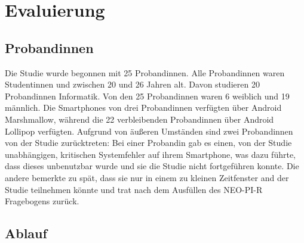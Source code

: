 
\chapter{Evaluierung}
\label{ch:Evaluierung}


\section{Probandinnen}
\label{ch:Evaluierung:sec:Abschnitt1}

Die Studie wurde begonnen mit 25 Probandinnen.
Alle Probandinnen waren Studentinnen und zwischen 20 und 26 Jahren alt.
Davon studieren 20 Probandinnen Informatik. 
Von den 25 Probandinnen waren 6 weiblich und 19 männlich.
Die Smartphones von drei Probandinnen verfügten über Android Marshmallow, während die 22 verbleibenden Probandinnen über Android Lollipop verfügten.  
Aufgrund von äußeren Umständen sind zwei Probandinnen von der Studie zurücktreten:
Bei einer Probandin gab es einen, von der Studie unabhängigen, kritischen Systemfehler auf ihrem Smartphone, was dazu führte, dass dieses unbenutzbar wurde und sie die Studie nicht fortgeführen konnte.
Die andere bemerkte zu spät, dass sie nur in einem zu kleinen Zeitfenster and der Studie teilnehmen könnte und trat nach dem Ausfüllen des NEO-PI-R Fragebogens zurück.


\section{Ablauf}
\label{ch:Entwurf:sec:Abschnitt2}

